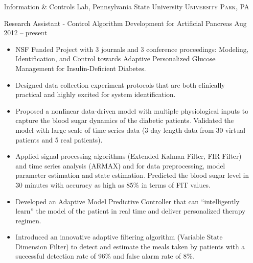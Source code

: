 \documentclass[10pt,a4paper]{article}
\begin{document}
\headedsection
{Information \& Controls Lab, Pennsylvania State University}
{\textsc{University Park, PA}}
  {
    \headedsubsection
    {Research Assistant - Control Algorithm Development for Artificial Pancreas}
    {Aug 2012 -- present}
    {
      \begin{itemize}
      \item NSF Funded Project with 3 journals and 3 conference proceedings:
        Modeling, Identification, and Control towards Adaptive Personalized Glucose
        Management for Insulin-Deficient Diabetes.
        
      \item Designed data collection experiment protocols that are both
        clinically practical and highly excited for system identification.

      \item Proposed a nonlinear data-driven model with multiple physiological
        inputs to capture the blood sugar dynamics of the diabetic patients.
        Validated the model with large scale of time-series data (3-day-length
        data from 30 virtual patients and 5 real patients). 
        
      \item Applied signal processing algorithms (Extended Kalman Filter, FIR
        Filter) and time series analysis (ARMAX) and for data preprocessing, model
        parameter estimation and state estimation. Predicted the blood sugar level in 30
        minutes with accuracy as high as 85\% in terms of FIT values.

      \item Developed an Adaptive Model Predictive Controller that can
        ``intelligently learn'' the model of the patient in real time and deliver
        personalized therapy regimen.
        
      \item Introduced an innovative adaptive filtering algorithm (Variable
        State Dimension Filter) to detect and estimate the meals taken by
        patients with a successful detection rate of 96\% and false alarm rate
        of 8\%.
      \end{itemize}
    }
  }
\end{document}
